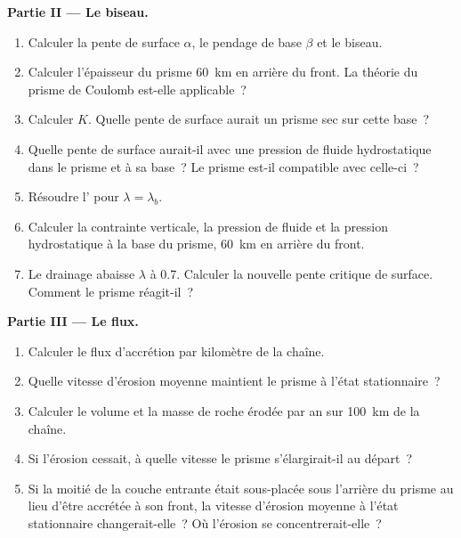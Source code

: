 \begin{problem}
\medskip\noindent\textbf{Partie II --- Le biseau.}
\begin{enumerate}[resume]
  \item Calculer la pente de surface $\alpha$, le pendage de base $\beta$ et le
        biseau.
  \item Calculer l'épaisseur du prisme \qty{60}{km} en arrière du front. La théorie
        du prisme de Coulomb est-elle applicable~?
  \item Calculer $K$. Quelle pente de surface aurait un prisme sec sur cette base~?
  \item Quelle pente de surface aurait-il avec une pression de fluide hydrostatique dans
        le prisme et à sa base~? Le prisme est-il compatible avec celle-ci~?
  \item Résoudre l' pour $\lambda = \lambda_b$.
  \item Calculer la contrainte verticale, la pression de fluide et la pression
        hydrostatique à la base du prisme, \qty{60}{km} en arrière du front.
  \item Le drainage abaisse $\lambda$ à 0.7. Calculer la nouvelle pente critique de
        surface. Comment le prisme réagit-il~?
\end{enumerate}

\medskip\noindent\textbf{Partie III --- Le flux.}
\begin{enumerate}[resume]
  \item Calculer le flux d'accrétion par kilomètre de la chaîne.
  \item Quelle vitesse d'érosion moyenne maintient le prisme à l'état stationnaire~?
  \item Calculer le volume et la masse de roche érodée par an sur
        \qty{100}{km} de la chaîne.
  \item Si l'érosion cessait, à quelle vitesse le prisme s'élargirait-il au départ~?
  \item Si la moitié de la couche entrante était sous-placée sous l'arrière du
        prisme au lieu d'être accrétée à son front, la vitesse d'érosion moyenne
        à l'état stationnaire changerait-elle~? Où l'érosion se concentrerait-elle~?
\end{enumerate}


\end{problem}
